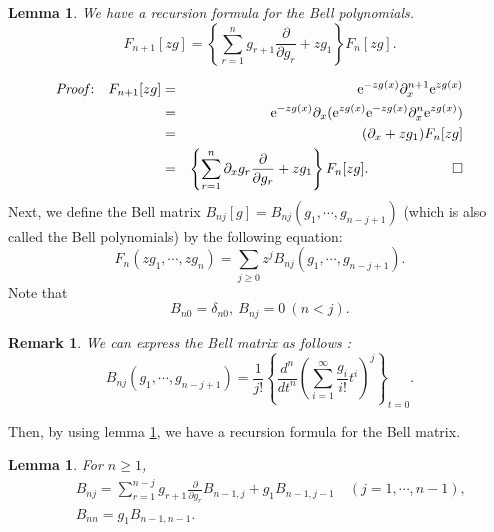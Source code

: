 \documentclass[makeidx,12pt,openany]{report}
\newtheorem{lem}[df]{Lemma}
\newtheorem{rmk}[df]{Remark}
\begin{document}
%
\begin{lem}
 We have a recursion formula for the Bell polynomials. 
\begin{equation}
 F_{n+1}[zg]=
  \left\{ 
   \sum_{r=1}^n g_{r+1} \frac{\partial}{\partial g_r}+zg_1
  \right\} F_n[zg].
 \label{eqn:shift}
\end{equation}
 \label{lem:recur1}
\end{lem}
\begin{eqnarray*}
 \mbox{\textit{Proof}:} \quad 
 F_{n+1}[zg] 
 &=& \mbox{e}^{-zg(x)} \partial_x^{n+1} \mbox{e}^{zg(x)} \\
 &=& \mbox{e}^{-zg(x)} \partial_x (\mbox{e}^{zg(x)} 
     \mbox{e}^{-zg(x)} \partial_x^n \mbox{e}^{zg(x)}) \\
 &=& (\partial_x+zg_1)F_n[zg]\\
 &=& \left\{ 
   \sum_{r=1}^n 
       \partial_x g_r \frac{\partial}{\partial g_r}
     +zg_1
     \right\} F_n[zg] .
 \qquad \qquad \qed 
\end{eqnarray*} 
Next, we define the Bell matrix $B_{nj}[g]=B_{nj}(g_1,\cdots,g_{n-j+1})$ 
  
(which is also called the Bell polynomials) by the following equation: 
\begin{equation}
 F_n(zg_1,\cdots,zg_n)=\sum_{j \geq 0} z^j B_{nj}(g_1,\cdots,g_{n-j+1}).
\end{equation}
Note that 
\begin{equation}
B_{n0}=\delta_{n0}, \ B_{nj}=0 \ (n < j).
\end{equation}
\begin{rmk}
We can express the Bell matrix as follows \cite{Al-Fre}:
\begin{equation}
 B_{nj}(g_1,\cdots,g_{n-j+1})
  =\frac{1}{j!}\left\{ \frac{d^n}{dt^n} \left(
   \sum_{i=1}^{\infty}\frac{g_i}{i!}t^i \right)^j \right\}_{t=0}.
\end{equation}
\end{rmk}
\noindent
Then, by using lemma \ref{lem:recur1}, we have a recursion formula 
for the Bell matrix. 
\begin{lem}For $n \geq 1$, 
\begin{eqnarray}
 &&B_{nj}=
   \sum_{r=1}^{n-j} g_{r+1} \frac{\partial}{\partial g_r}
    B_{n-1,j} + g_1 B_{n-1,j-1} \quad (j=1,\cdots,n-1), \label{eqn:rec2}\\
 &&B_{nn}= g_1 B_{n-1,n-1} 
 \label{eqn:rec3}. 
\end{eqnarray}
 \label{lem:recur2}
\end{lem}
\end{document}
